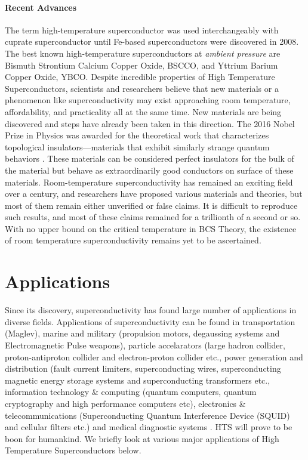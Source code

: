 \documentclass{article}
\begin{document}
	\paragraph{Recent Advances}
	The term high-temperature superconductor was used interchangeably with cuprate superconductor until Fe-based superconductors were discovered in 2008. The best known high-temperature superconductors at \textit{ambient pressure} are Bismuth Strontium Calcium Copper Oxide, BSCCO, and Yttrium Barium Copper Oxide, YBCO. Despite incredible properties of High Temperature Superconductors, scientists and researchers believe that new materials or a phenomenon like superconductivity may exist approaching room temperature, affordability, and practicality all at the same time. New materials are being discovered and steps have already been taken in this direction. The 2016 Nobel Prize in Physics was awarded for the theoretical work that characterizes topological insulators—materials that exhibit similarly strange quantum behaviors \cite{noblePress}. These materials can be considered perfect insulators for the bulk of the material but behave as extraordinarily good conductors on surface of these materials. Room-temperature superconductivity has remained an exciting field over a century, and researchers have proposed various materials and theories, but most of them remain either unverified or false claims. It is difficult to reproduce such results, and most of these claims remained for a trillionth of a second or so. With no upper bound on the critical temperature in BCS Theory, the existence of room temperature superconductivity remains yet to be ascertained.
	
	\section{Applications}
	Since its discovery, superconductivity has found large number of applications in diverse fields. Applications of superconductivity can be found in transportation (Maglev), marine and military (propulsion motors, degaussing systems and Electromagnetic Pulse weapons), particle accelarators (large hadron collider, proton-antiproton collider and
	electron-proton collider etc., power generation and distribution (fault current limiters, superconducting wires, superconducting magnetic energy storage systems and superconducting transformers etc., information technology \& computing (quantum computers, quantum cryptography and high performance computers etc), electronics \& telecommunications (Superconducting Quantum Interference Device (SQUID) and cellular filters etc.) and medical diagnostic systems \cite{saleem2014}. HTS will prove to be boon for humankind. We briefly look at various major applications of High Temperature Superconductors below.
	
\end{document}
